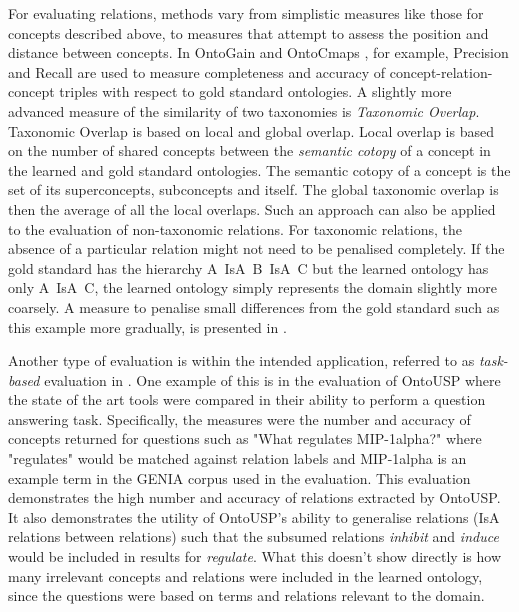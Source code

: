 \documentclass[a4paper]{report}
\begin{document}
For evaluating relations, methods vary from simplistic measures like those for concepts described above, to measures that attempt to assess the position and distance between concepts.
In OntoGain\cite{Drymonas10OntoGain} and OntoCmaps \cite{Zouaq11OntoCmaps}, for example, Precision and Recall are used to measure completeness and accuracy of concept-relation-concept triples with respect to gold standard ontologies.
A slightly more advanced measure of the similarity of two taxonomies is \emph{Taxonomic Overlap}\cite{MaedcheStaab02TaxSim}.
Taxonomic Overlap is based on local and global overlap\cite{Dellschaft08EvalStrateg}.
Local overlap is based on the number of shared concepts between the \emph{semantic cotopy} of a concept in the learned and gold standard ontologies. The semantic cotopy of a concept is the set of its superconcepts, subconcepts and itself\cite{Dellschaft08EvalStrateg}.
The global taxonomic overlap is then the average of all the local overlaps.
Such an approach can also be applied to the evaluation of non-taxonomic relations\cite{Wong11Survey}.
For taxonomic relations, the absence of a particular relation might not need to be penalised completely.
If the gold standard has the hierarchy A~IsA~B~IsA~C but the learned ontology has only A~IsA~C, the learned ontology simply represents the domain slightly more coarsely.
A measure to penalise small differences from the gold standard such as this example more gradually, is presented in \cite{Hjelm09Thesis}.


Another type of evaluation is within the intended application, referred to as \emph{task-based} evaluation in \cite{Wong11Survey}.
One example of this is in the evaluation of OntoUSP\cite{Poon2010OntoUSP} where the state of the art tools were compared in their ability to perform a question answering task.
Specifically, the measures were the number and accuracy of concepts returned for questions such as "What regulates MIP-1alpha?" where "regulates" would be matched against relation labels and MIP-1alpha is an example term in the GENIA corpus used in the evaluation.
This evaluation demonstrates the high number and accuracy of relations extracted by OntoUSP.
It also demonstrates the utility of OntoUSP's ability to generalise relations (IsA relations between relations) such that the subsumed relations \emph{inhibit} and \emph{induce} would be included in results for \emph{regulate}.
What this doesn't show directly is how many irrelevant concepts and relations were included in the learned ontology, since the questions were based on terms and relations relevant to the domain\cite{Poon09USP}.
\end{document}
